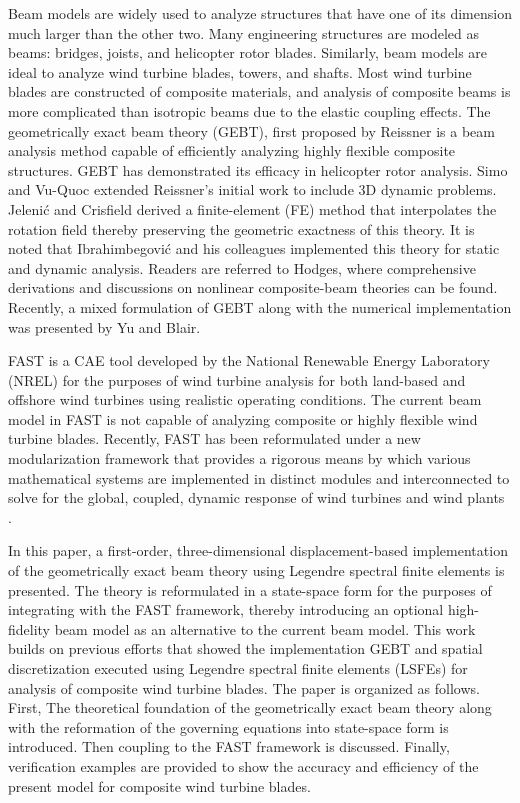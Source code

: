 \documentclass{aiaa-tc}
\begin{document}
Beam models are widely used to analyze structures that have one of its dimension much larger than the other two.  Many engineering structures are modeled as beams: bridges, joists, and helicopter rotor blades. Similarly, beam models are ideal to analyze wind turbine blades, towers, and shafts.  Most wind turbine blades are constructed of composite materials, and analysis of composite beams is more complicated than isotropic beams due to the elastic coupling effects.  The geometrically exact beam theory (GEBT), first proposed by Reissner\cite{Ressiner1973} is a beam analysis method capable of efficiently analyzing highly flexible composite structures.  GEBT has demonstrated its efficacy in helicopter rotor analysis. Simo\cite{Simo1985} and Vu-Quoc\cite{Simo1986} extended Reissner's initial work to include 3D dynamic problems. Jeleni\'c and Crisfield\cite{Crisfield1999} derived a finite-element (FE) method that interpolates the rotation field thereby preserving the geometric exactness of this theory. It is noted that Ibrahimbegovi\'c and his colleagues implemented this theory for static\cite{Ibrahim1995} and dynamic\cite{Ibrahim1998} analysis. Readers are referred to Hodges\cite{HodgesBeamBook}, where comprehensive derivations and discussions on nonlinear composite-beam theories can be found. Recently, a mixed formulation of GEBT along with the numerical implementation was presented by Yu and Blair\cite{YuGEBT}.  

FAST is a CAE tool developed by the National Renewable Energy Laboratory (NREL) for the purposes of wind turbine analysis for both land-based and offshore wind turbines using realistic operating conditions.  The current beam model in FAST is not capable of analyzing composite or highly flexible wind turbine blades. Recently, FAST has been reformulated under a new modularization framework that provides a rigorous means by which various mathematical systems are implemented in distinct modules and interconnected to solve for the global, coupled, dynamic response of wind turbines and wind plants \cite{Jonkman:2013,website:FASTModularizationFramework}.

In this paper, a first-order, three-dimensional displacement-based implementation of the geometrically exact beam theory using Legendre spectral finite elements is presented. The theory is reformulated in a state-space form for the purposes of integrating with the FAST framework, thereby introducing an optional high-fidelity beam model as an alternative to the current beam model. This work builds on previous efforts that showed the implementation GEBT and spatial discretization executed using Legendre spectral finite elements (LSFEs)\cite{Wang:GEBT2013,Wang:SFE2013,Wang:GEBT2014,Sprague:FAST2014} for analysis of composite wind turbine blades. The paper is organized as follows.  First, The theoretical foundation of the geometrically exact beam theory along with the reformation of the governing equations into state-space form is introduced. Then coupling to the FAST framework is discussed. Finally, verification examples are provided to show the accuracy and efficiency of the present model for composite wind turbine blades. 
\end{document}
